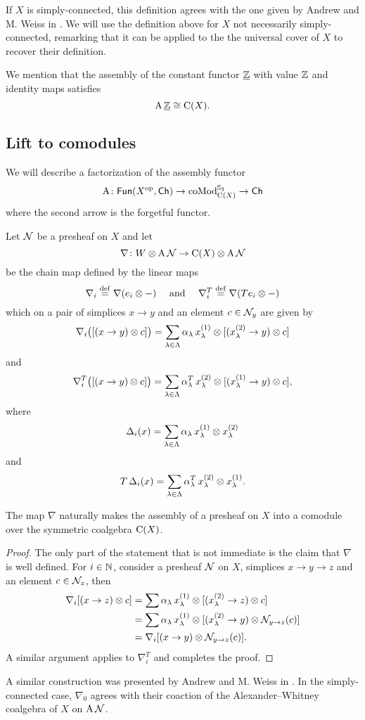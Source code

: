 If $X$ is simply-connected, this definition agrees with the one given by Andrew and M. Weiss in \cite[Definition 1.4]{ranicki1990assembly}.
We will use the definition above for $X$ not necessarily simply-connected, remarking that it can be applied to the the universal cover of $X$ to recover their definition.

We mention that the assembly of the constant functor $\underline {\mathbb{Z}}$ with value $\mathbb{Z}$ and identity maps satisfies
\[
\operatorname{A} \underline{\mathbb{Z}} \cong \operatorname{C}(X).
\]

\subsection{Lift to comodules}

We will describe a factorization of the assembly functor
\[
\operatorname{A} \colon \mathsf{Fun}(X^{\mathrm{op}}, \mathsf{Ch}) \to \operatorname{coMod}^{\mathbb{S}_2}_{\operatorname{C}(X)} \to \mathsf{Ch}
\]
where the second arrow is the forgetful functor.

Let $\mathcal{N}$ be a presheaf on $X$ and let
\[
\nabla \colon W \otimes \operatorname{A} \mathcal{N} \to \operatorname{C}(X) \otimes \operatorname{A} \mathcal{N}
\]
be the chain map defined by the linear maps
\[
\nabla_i \stackrel{\mathrm{def}}{=} \nabla(e_i \otimes -)
\quad \text{ and } \quad
\nabla_i^T \stackrel{\mathrm{def}}{=} \nabla(Te_i \otimes -)
\]
which on a pair of simplices $x \to y$ and an element $c \in \mathcal{N}_y$ are given by
\[
\nabla_i \big( [(x \to y) \otimes c] \big) =
\sum_{\lambda \in \Lambda} \alpha_\lambda \, x_\lambda^{(1)} \otimes [(x_\lambda^{(2)} \to y) \otimes c]
\]
and
\[
\nabla_i^T \big( [(x \to y) \otimes c] \big) =
\sum_{\lambda \in \Lambda} \alpha^T_\lambda \, x_\lambda^{(2)} \otimes [(x_\lambda^{(1)} \to y) \otimes c],
\]
where
\[
\operatorname{\Delta}_i(x) = \sum_{\lambda \in \Lambda} \alpha_\lambda \, x_\lambda^{(1)} \otimes x_\lambda^{(2)}
\]
and
\[
T \operatorname{\Delta}_i(x) =
\sum_{\lambda \in \Lambda} \alpha^T_\lambda \, x_\lambda^{(2)} \otimes x_\lambda^{(1)}.
\]

\begin{lemma*}
	The map $\nabla$ naturally makes the assembly of a presheaf on $X$ into a comodule over the symmetric coalgebra $\operatorname{C}(X)$.
\end{lemma*}

\begin{proof}
	The only part of the statement that is not immediate is the claim that $\nabla$ is well defined.
	For $i \in \mathbb{N}$, consider a presheaf $\mathcal{N}$ on $X$, simplices $x \to y \to z$ and an element $c \in \mathcal{N}_z$, then
	\begin{align*}
		\nabla_i [(x \to z) \otimes c] &=
		\sum \alpha_\lambda \, x^{(1)}_\lambda \otimes {[(x^{(2)}_\lambda \to z) \otimes c]} \\ &=
		\sum \alpha_\lambda \, x^{(1)}_\lambda \otimes [(x^{(2)}_\lambda \to y) \otimes \mathcal{N}_{y \to z}(c)] \\ &=
		\nabla_i [(x \to y) \otimes \mathcal{N}_{y \to z}(c)].
	\end{align*}
	A similar argument applies to $\nabla^T_i$ and completes the proof.
\end{proof}

A similar construction was presented by Andrew and M. Weiss in \cite[Proposition~5.3]{ranicki1990assembly}.
In the simply-connected case, $\nabla_0$ agrees with their coaction of the Alexander--Whitney coalgebra of $X$ on $\operatorname{A} \mathcal{N}$.